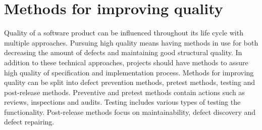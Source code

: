 
 \section{Methods for improving quality}
 
Quality of a software product can be influenced throughout its life cycle with multiple approaches. Pursuing high quality means having methods in use for both decreasing the amount of defects and maintaining good structural quality. In addition to these technical approaches, projects should have methods to assure high quality of specification and implementation process. Methods for improving quality can be split into defect prevention methods, pretest methods, testing and post-release methods. Preventive and pretest methods contain actions such as reviews, inspections and audits. Testing includes various types of testing the functionality. Post-release methods focus on maintainability, defect discovery and defect repairing.







 

 

 

